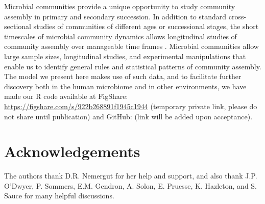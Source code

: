 \documentclass{article}
\begin{document}
\par
Microbial communities provide a unique opportunity to study community assembly in primary and secondary succession. In addition to standard cross-sectional studies of communities of different ages or successional stages, the short timescales of microbial community dynamics allows longitudinal studies of community assembly over manageable time frames \cite{David2014,Kennedy2016}. Microbial communities allow large sample sizes, longitudinal studies, and experimental manipulations that enable us to identify general rules and statistical patterns of community assembly. The model we present here makes use of such data, and to facilitate further discovery both in the human microbiome and in other environments, we have made our R code available at FigShare: \url{https://figshare.com/s/922b268891f1945c1944} (temporary private link, please do not share until publication) and GitHub: (link will be added upon acceptance).

\section{Acknowledgements}
The authors thank D.R. Nemergut for her help and support, and also thank J.P. O'Dwyer, P. Sommers, E.M. Gendron, A. Solon, E. Pruesse, K. Hazleton, and S. Sauce for many helpful discussions. 


\newpage
\end{document}
